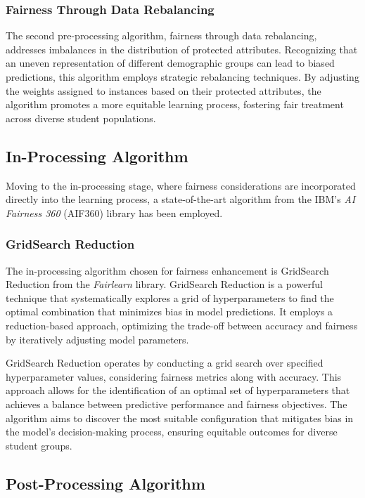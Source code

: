 \subsubsection{Fairness Through Data Rebalancing}

The second pre-processing algorithm, fairness through data rebalancing, addresses imbalances in the distribution of protected attributes. Recognizing that an uneven representation of different demographic groups can lead to biased predictions, this algorithm employs strategic rebalancing techniques. By adjusting the weights assigned to instances based on their protected attributes, the algorithm promotes a more equitable learning process, fostering fair treatment across diverse student populations.

\subsection{In-Processing Algorithm}

Moving to the in-processing stage, where fairness considerations are incorporated directly into the learning process, a state-of-the-art algorithm from the IBM's \emph{AI Fairness 360} (AIF360) library has been employed.

\subsubsection{GridSearch Reduction}

The in-processing algorithm chosen for fairness enhancement is GridSearch Reduction from the \emph{Fairlearn} library. GridSearch Reduction is a powerful technique that systematically explores a grid of hyperparameters to find the optimal combination that minimizes bias in model predictions. It employs a reduction-based approach, optimizing the trade-off between accuracy and fairness by iteratively adjusting model parameters.

GridSearch Reduction operates by conducting a grid search over specified hyperparameter values, considering fairness metrics along with accuracy. This approach allows for the identification of an optimal set of hyperparameters that achieves a balance between predictive performance and fairness objectives. The algorithm aims to discover the most suitable configuration that mitigates bias in the model's decision-making process, ensuring equitable outcomes for diverse student groups. \cite{agarwal2018reductions}

\subsection{Post-Processing Algorithm}

